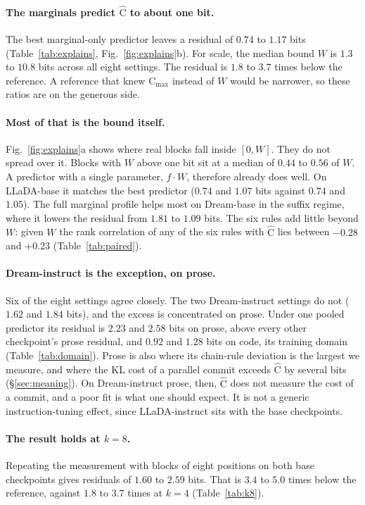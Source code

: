 \documentclass{article}
\newcommand{\C}{\mathrm{C}}
\newcommand{\Chat}{\widehat{\C}}
\begin{document}
\paragraph{The marginals predict $\Chat$ to about one bit.} The best marginal-only
predictor leaves a residual of $0.74$ to $1.17$ bits (Table~\ref{tab:explains},
Fig.~\ref{fig:explains}b). For scale, the median bound $W$ is $1.3$ to $10.8$ bits
across all eight settings. The residual is $1.8$ to $3.7$ times below the reference. A
reference that knew $\C_{\max}$ instead of $W$ would be narrower, so these ratios are on
the generous side.

\paragraph{Most of that is the bound itself.} Fig.~\ref{fig:explains}a shows where real
blocks fall inside $[0,W]$. They do not spread over it. Blocks with $W$ above one bit
sit at a median of $0.44$ to $0.56$ of $W$. A predictor with a single parameter,
$f\cdot W$, therefore already does well. On LLaDA-base it matches the best predictor
($0.74$ and $1.07$ bits against $0.74$ and $1.05$). The full marginal profile helps
most on Dream-base in the suffix regime, where it lowers the residual from $1.81$ to
$1.09$ bits. The six rules add little beyond $W$: given $W$ the rank correlation of any
of the six rules with $\Chat$ lies between $-0.28$ and $+0.23$ (Table~\ref{tab:paired}).

\paragraph{Dream-instruct is the exception, on prose.} Six of the eight settings agree
closely. The two Dream-instruct settings do not ($1.62$ and $1.84$ bits), and the excess
is concentrated on prose.
Under one pooled predictor its residual is $2.23$ and $2.58$ bits on prose, above every
other checkpoint's prose residual, and $0.92$ and $1.28$ bits on code, its training
domain (Table~\ref{tab:domain}). Prose is also where its chain-rule deviation is the
largest we measure, and where the KL cost of a parallel commit exceeds $\Chat$ by
several bits (\S\ref{sec:meaning}). On Dream-instruct prose, then, $\Chat$ does not
measure the cost of a commit, and a poor fit is what one should expect. It is not a generic instruction-tuning effect, since LLaDA-instruct sits with the base
checkpoints.

\paragraph{The result holds at $k{=}8$.} Repeating the measurement with blocks of eight
positions on both base checkpoints gives residuals of $1.60$ to $2.59$ bits. That is
$3.4$ to $5.0$ times below the reference, against $1.8$ to $3.7$ times at $k{=}4$
(Table~\ref{tab:k8}).
\end{document}
